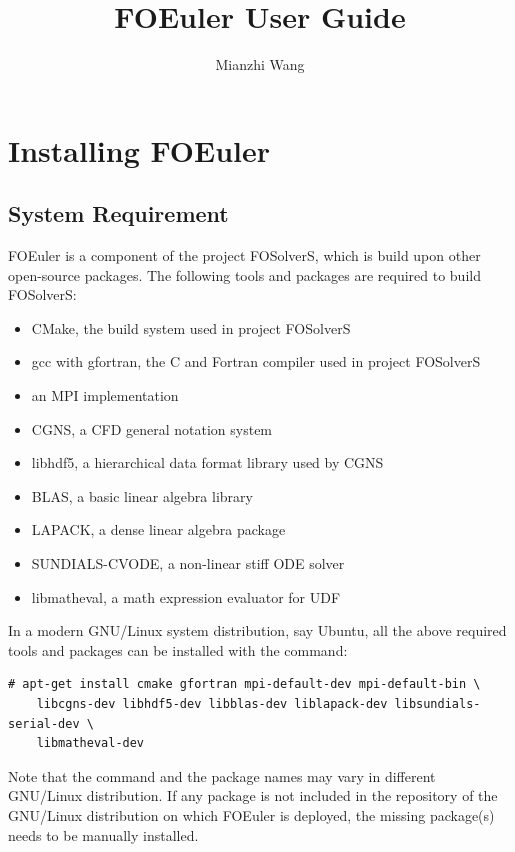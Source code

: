 \documentclass[]{article}
\title{FOEuler User Guide}
\author{Mianzhi Wang}
\begin{document}
\maketitle

\tableofcontents

\section{Installing FOEuler}

\subsection{System Requirement}
\label{sec:requirement}

FOEuler is a component of the project FOSolverS, which is build upon other open-source packages.
The following tools and packages are required to build FOSolverS:
\begin{itemize}
  \item CMake, the build system used in project FOSolverS
  \item gcc with gfortran, the C and Fortran compiler used in project FOSolverS
  \item an MPI implementation
  \item CGNS, a CFD general notation system
  \item libhdf5, a hierarchical data format library used by CGNS
  \item BLAS, a basic linear algebra library
  \item LAPACK, a dense linear algebra package
  \item SUNDIALS-CVODE, a non-linear stiff ODE solver
  \item libmatheval, a math expression evaluator for UDF
\end{itemize}
In a modern GNU/Linux system distribution, say Ubuntu, all the above required tools and packages can
be installed with the command:
\begin{lstlisting}[backgroundcolor=\color{lightgray}]
  # apt-get install cmake gfortran mpi-default-dev mpi-default-bin \
    libcgns-dev libhdf5-dev libblas-dev liblapack-dev libsundials-serial-dev \
    libmatheval-dev
\end{lstlisting}
Note that the command and the package names may vary in different GNU/Linux distribution.
If any package is not included in the repository of the GNU/Linux distribution on which FOEuler is
deployed, the missing package(s) needs to be manually installed.
\end{document}
